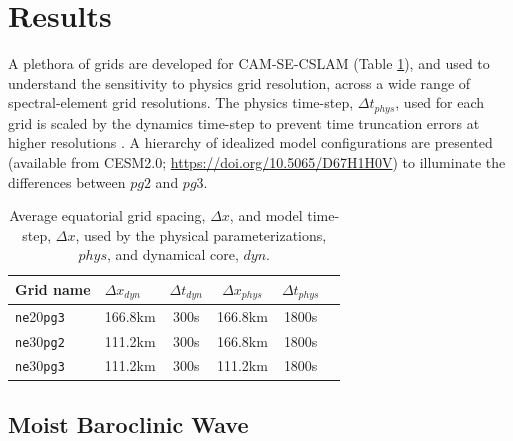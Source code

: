 \documentclass{agujournal}
\begin{document}
\section{Results}

A plethora of grids are developed for CAM-SE-CSLAM (Table \ref{table:grids}), and used to understand the sensitivity to physics grid resolution, across a wide range of spectral-element grid resolutions. The physics time-step, $\Delta t_{phys}$, used for each grid is scaled by the dynamics time-step to prevent time truncation errors at higher resolutions \citep{HR2018JAMES}. A hierarchy of idealized model configurations are presented (available from CESM2.0; \url{https://doi.org/10.5065/D67H1H0V}) to illuminate the differences between $pg2$ and $pg3$.

 \begin{table}
 \caption{Average equatorial grid spacing, $\Delta x$, and model time-step, $\Delta x$, used by the physical parameterizations, $phys$, and dynamical core, $dyn$.}
 \centering
 \begin{tabular}{llcccc}
 \hline
 Grid name & $\Delta x_{dyn}$  & $\Delta t_{dyn}$ & $\Delta x_{phys}$  & $\Delta t_{phys}$ \\
 \hline
   {\tt{ne}}20{\tt{pg3}}  & 166.8km & 300s  & 166.8km & 1800s \\
   {\tt{ne}}30{\tt{pg2}}  & 111.2km & 300s  & 166.8km & 1800s \\
   {\tt{ne}}30{\tt{pg3}}  & 111.2km & 300s  & 111.2km & 1800s \\
 \hline
 \end{tabular}
 \label{table:grids}
 \end{table}

\subsection{Moist Baroclinic Wave}
\end{document}
